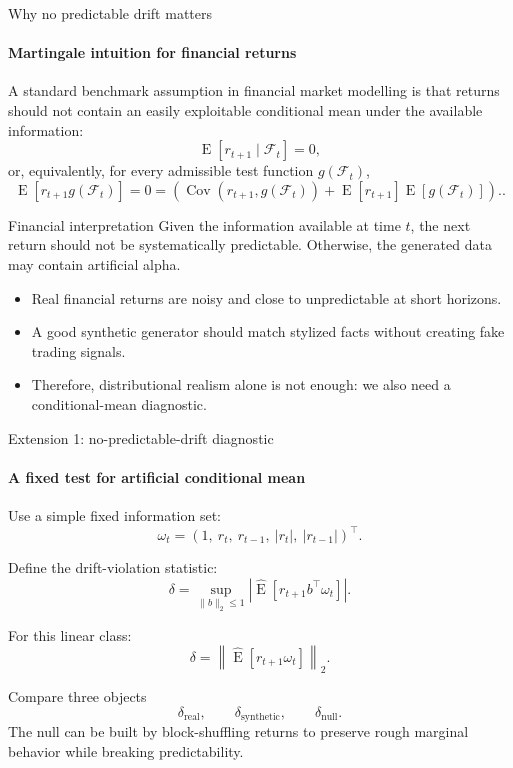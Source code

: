 \begin{frame}{Why no predictable drift matters}
\framesubtitle{Martingale intuition for financial returns}

A standard benchmark assumption in financial market modelling is that returns should not contain
an easily exploitable conditional mean under the available information:
\[
\operatorname{E}\!\left[r_{t+1}\mid \mathcal{F}_t\right] = 0,
\]
or, equivalently, for every admissible test function \(g(\mathcal{F}_t)\),
\[
\operatorname{E}\!\left[r_{t+1} g(\mathcal{F}_t)\right] = 0 = \left(
\operatorname{Cov}(r_{t+1},g(\mathcal{F}_t))
+
\operatorname{E}[r_{t+1}]\operatorname{E}[g(\mathcal{F}_t)]
\right)..
\]



\begin{block}{Financial interpretation}
Given the information available at time \(t\), the next return should not be systematically predictable.
Otherwise, the generated data may contain \alert{artificial alpha}.
\end{block}

\begin{itemize}
\item Real financial returns are noisy and close to unpredictable at short horizons.
\item A good synthetic generator should match stylized facts without creating fake trading signals.
\item Therefore, distributional realism alone is not enough: we also need a conditional-mean diagnostic.
\end{itemize}

\end{frame}


\begin{frame}{Extension 1: no-predictable-drift diagnostic}
\framesubtitle{A fixed test for artificial conditional mean}

Use a simple fixed information set:
\[
\omega_t =
\left(1,\ r_t,\ r_{t-1},\ |r_t|,\ |r_{t-1}|\right)^\top .
\]

Define the drift-violation statistic:
\[
\delta
=
\sup_{\|b\|_2 \leq 1}
\left|
\widehat{\operatorname{E}}
\left[
r_{t+1} b^\top \omega_t
\right]
\right|.
\]

For this linear class:
\[
\delta
=
\left\|
\widehat{\operatorname{E}}
\left[
r_{t+1}\omega_t
\right]
\right\|_2 .
\]

\begin{block}{Compare three objects}
\[
\delta_{\text{real}},
\qquad
\delta_{\text{synthetic}},
\qquad
\delta_{\text{null}} .
\]
The null can be built by block-shuffling returns to preserve rough marginal behavior while breaking predictability.
\end{block}

\end{frame}

